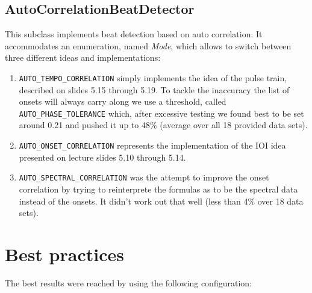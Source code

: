\subsection{\ttfamily AutoCorrelationBeatDetector} \label{ssec:beatauto}
This subclass implements beat detection based on auto correlation. It
accommodates an enumeration, named \emph{Mode}, which allows to switch between
three different ideas and implementations:

\begin{enumerate}
  \item \texttt{AUTO\_TEMPO\_CORRELATION} simply implements the idea of the
  pulse train, described on slides 5.15 through 5.19. To tackle the inaccuracy the
  list of onsets will always carry along we use a threshold, called
  \texttt{AUTO\_PHASE\_TOLERANCE} which, after excessive testing we found best
  to be set around 0.21 and pushed it up to 48\% (average over all 18 provided data
  sets).
  \item \texttt{AUTO\_ONSET\_CORRELATION} represents the implementation of the
  IOI idea presented on lecture slides 5.10 through 5.14.
  \item \texttt{AUTO\_SPECTRAL\_CORRELATION} was the attempt to improve the
  onset correlation by trying to reinterprete the formulas as to be the spectral data
  instead of the onsets. It didn't work out that well (less than 4\% over 18
  data sets).
\end{enumerate}

\section{Best practices} \label{sec:bestresults}
The best results were reached by using the following configuration:


